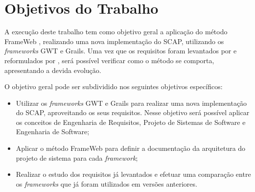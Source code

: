
\section{Objetivos do Trabalho}
\label{sec-objetivos}


A execução deste trabalho tem como objetivo geral a aplicação do método FrameWeb \cite{souza:masterthesis07}, realizando uma nova implementação do SCAP, utilizando os \textit{frameworks} GWT e Grails. Uma vez que os requisitos foram levantados por  e reformulados por , será possível verificar como o método se comporta, apresentando a devida evolução.

O objetivo geral pode ser subdividido nos seguintes objetivos específicos:

\begin{itemize}

	\item Utilizar os \textit{frameworks} GWT e Grails para realizar uma nova implementação do SCAP, aproveitando os seus requisitos. Nesse objetivo será possível aplicar os conceitos de Engenharia de Requisitos, Projeto de Sistemas de Software e Engenharia de Software;
	\item Aplicar o método FrameWeb para definir a documentação da arquitetura do projeto de sistema para cada \textit{framework};
    \item Realizar o estudo dos requisitos já levantados e efetuar uma comparação entre os \textit{frameworks} que já foram utilizados em versões anteriores.

\end{itemize}
